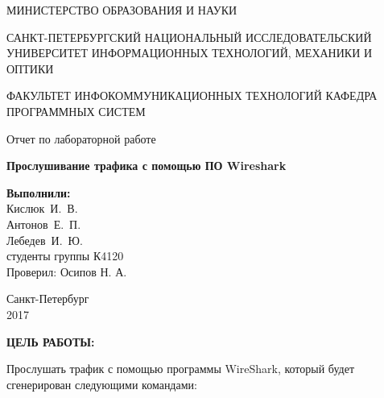 \documentclass[14pt,a4paper]{extreport}
\begin{document}
	\begin{titlepage}
	\begin{center}	
		\fontsize{14pt}{14pt}\selectfont
		МИНИСТЕРСТВО ОБРАЗОВАНИЯ И НАУКИ\\

		\vspace*{0.6\baselineskip}
		
		САНКТ-ПЕТЕРБУРГСКИЙ НАЦИОНАЛЬНЫЙ ИССЛЕДОВАТЕЛЬСКИЙ УНИВЕРСИТЕТ ИНФОРМАЦИОННЫХ ТЕХНОЛОГИЙ, МЕХАНИКИ И ОПТИКИ
		
		\vspace*{0.6\baselineskip}
		ФАКУЛЬТЕТ ИНФОКОММУНИКАЦИОННЫХ ТЕХНОЛОГИЙ
		КАФЕДРА ПРОГРАММНЫХ СИСТЕМ
	
		\vspace*{7\baselineskip}
		\fontsize{19pt}{18pt}\selectfont
		Отчет по лабораторной работе
		
		\fontsize{20pt}{18pt}\selectfont
		\textbf{Прослушивание трафика с помощью ПО Wireshark}\\
		\vspace*{1.15\baselineskip}
		\end{center}
	
	\vspace*{2\baselineskip}
	\begin{flushright}
	\fontsize{14pt}{14pt}\selectfont
	\textbf{Выполнили:}\\
	Кислюк~И.~В.\\
	Антонов~Е.~П.\\
	Лебедев~И.~Ю.\\
	студенты группы К4120\\
	Проверил: Осипов Н. А.\\
	\end{flushright}
	
	\vspace*{2\baselineskip}
	\begin{center}
	Санкт-Петербург\\
	2017
	\end{center}
	
\end{titlepage}

\newpage

\fontsize{16pt}{14pt}\selectfont
\begin{center}
\textbf{ЦЕЛЬ РАБОТЫ:}
\end{center}

Прослушать трафик с помощью программы WireShark, который будет сгенерирован следующими командами:
\end{document}

